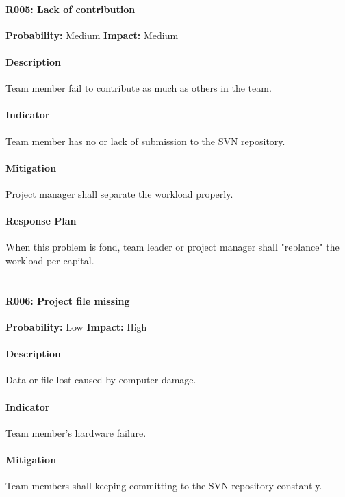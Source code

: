 \documentclass[11pt, a4paper]{report}
\begin{document}
\pagebreak

	\paragraph{R005: Lack of contribution} \hspace{1cm} \textbf{Probability: }Medium\hspace{1cm}   \textbf{Impact: }Medium
	\paragraph{Description}Team member fail to contribute as much as others in the team.
	\paragraph{Indicator}Team member has no or lack of submission to the SVN repository. 
	\paragraph{Mitigation}Project manager shall separate the workload properly.
	\paragraph{Response Plan}When this problem is fond, team leader or project manager shall "reblance" the workload per capital. \\\\

	\paragraph{R006: Project file missing} \hspace{1cm} \textbf{Probability: }Low\hspace{1cm}   \textbf{Impact: }High
	\paragraph{Description}Data or file lost caused by computer damage.
	\paragraph{Indicator}Team member's hardware failure. 
	\paragraph{Mitigation}Team members shall keeping committing to the SVN repository constantly.
\end{document}
